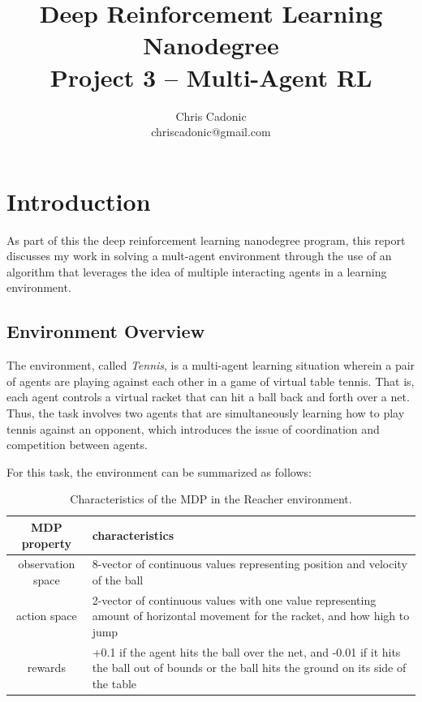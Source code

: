 \documentclass[11pt]{article}
\begin{document}
	
	\title{Deep Reinforcement Learning Nanodegree\\
		Project 3 -- Multi-Agent RL}
	\author{\vspace{-1mm}Chris Cadonic\\
		chriscadonic@gmail.com}
	\maketitle
	\vspace{-1.5em}
	
	\section{Introduction}
	
	As part of this the deep reinforcement learning nanodegree program, this report discusses my work in solving a mult-agent environment through the use of an algorithm that leverages the idea of multiple interacting agents in a learning environment.
	
	\subsection{Environment Overview}
	
	The environment, called \textit{Tennis}, is a multi-agent learning situation wherein a pair of agents are playing against each other in a game of virtual table tennis. That is, each agent controls a virtual racket that can hit a ball back and forth over a net. Thus, the task involves two agents that are simultaneously learning how to play tennis against an opponent, which introduces the issue of coordination and competition between agents.
	
	For this task, the environment can be summarized as follows:
	
	\begin{table}[!ht]
		\centering
		\begin{tabular}{ c | p{10cm} }
			\textbf{MDP property} & \textbf{characteristics} \\
			\hline
			observation space & 8-vector of continuous values representing position and velocity of the ball \\
			\hline
			action space & 2-vector of continuous values with one value representing amount of horizontal movement for the racket, and how high to jump \\
			\hline
			rewards & +0.1 if the agent hits the ball over the net, and -0.01 if it hits the ball out of bounds or the ball hits the ground on its side of the table \\
			\hline
		\end{tabular}
		\caption{Characteristics of the MDP in the Reacher environment.}
		\label{tbl:mdp}
	\end{table}
	
\end{document}

